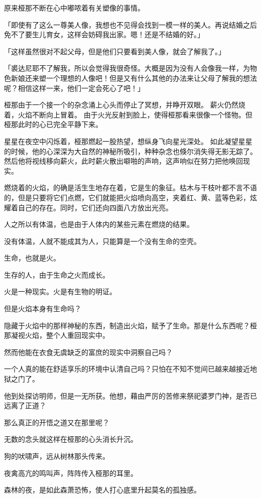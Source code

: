\documentclass[twoside,openany]{book}
\begin{document}
原来桠那不断在心中嘟哝着有关塑像的事情。

「即使有了这么一尊美人像，我想也不见得会找到一模一样的美人。再说结婚之后免不了要生儿育女，这样会妨碍我出家。嗯！还是不结婚的好。」

「这样虽然很对不起父母，但是他们只要看到美人像，就会了解我了。」

「裘达尼耶不了解我，所以会觉得我很奇怪。大概是因为没有人会像我一样，为物色新娘还来塑一个理想的人像吧！但是又有什么其他的办法来让父母了解我的想法呢？相信这样一来，他们一定会死心了吧！」

桠那由于一个接一个的杂念涌上心头而停止了冥想，并睁开双眼。
薪火仍然烧着，火焰不断向上冒着。
由于火光反射到脸上，使得桠那看来很像一个怪物。但桠那此时的心已完全平静下来。

星星在夜空中闪烁着，桠那燃起一股热望，想纵身飞向星光深处。
如此凝望星星的时候，他的心深深为大自然的神秘所吸引，种种杂念也倏尔消失得无影无踪了。
然后他将视线移向薪火，此时薪火散出噼啪的声响，这声响似在努力把他唤回现实。

燃烧着的火焰，的确是活生生地存在着，它是生的象征。枯木与干枝叶都不言不语的，但是只要将它们点燃，它们就能把火焰喷向高空，夹着红、黄、蓝等色彩，炫耀着自己的存在。同时，它们还向四面八方放出光亮。

人之所以有体温，也是由于人体内的某些元素在燃烧的结果。

没有体温，人就不能成其为人，只能算是一个没有生命的空壳。

生命，也就是火。

生存的人，由于生命之火而成长。

火是一种现实。火是有生物的明证。

但是火焰本身有生命吗？

隐藏于火焰中的那样神秘的东西，制造出火焰，赋予了生命。那是什么东西呢？桠那凝视火焰，整个人重回现实中。

然而他能在衣食无虞缺乏的富庶的现实中洞察自己吗？

一个人真的能在舒适享乐的环境中认清自己吗？只怕在不知不觉间已越来越接近地狱之门了。

他到处探访明师，但是一无所获。他想，藉由严厉的苦修来祭祀婆罗门神，是否已远离了正道？

那么真正的开悟之道又在那里呢？

无数的念头就这样在桠那的心头消长升沉。

狗的吠啸声，远从树林那头传来。

夜禽高亢的鸣叫声，阵阵传入桠那的耳里。

森林的夜，是如此森萧恐怖，使人打心底里升起莫名的孤独感。
\end{document}
